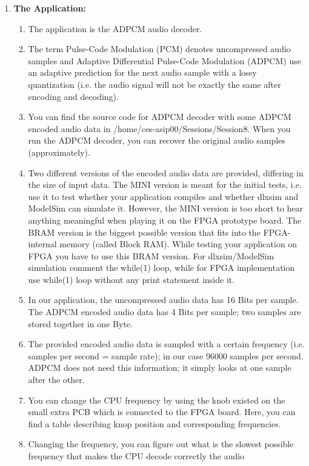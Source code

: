 \begin{enumerate}
\item \textbf{The Application:}
	\begin{enumerate}
		\item
		The application is the ADPCM audio decoder.
		\item
		The term Pulse-Code Modulation (PCM) denotes uncompressed audio
		samples and Adaptive Differential Pulse-Code Modulation (ADPCM) use
		an adaptive prediction for the next audio sample with a lossy
		quantization (i.e. the audio signal will not be exactly the same
		after encoding and decoding).
		\item
		You can find the source code for ADPCM decoder with some ADPCM
		encoded audio data in /home/ces-asip00/Sessions/Session8. When you run
		the ADPCM decoder, you can recover the original audio samples
		(approximately).
		\item
		Two different versions of the encoded audio data are provided,
		differing in the size of input data. The MINI version is meant for
		the initial tests, i.e. use it to test whether your application
		compiles and whether dlxsim and ModelSim can simulate it. However,
		the MINI version is too short to hear anything meaningful when
		playing it on the FPGA prototype board. The BRAM version is the
		biggest possible version that fits into the FPGA-internal memory
		(called Block RAM). While testing your application on FPGA you have
		to use this BRAM version. For dlxsim/ModelSim simulation comment the
		while(1) loop, while for FPGA implementation use while(1) loop
		without any print statement inside it.
		\item
		In our application, the uncompressed audio data has 16 Bits per
		sample. The ADPCM encoded audio data has 4 Bits per sample; two
		samples are stored together in one Byte.
		\item
		The provided encoded audio data is sampled with a certain frequency
		(i.e. samples per second = sample rate); in our case 96000 samples
		per second. ADPCM does not need this information; it simply looks at
		one sample after the other.
		\item
		You can change the CPU frequency by using the knob existed on the
		small extra PCB which is connected to the FPGA board. Here, you can
		find a table describing knop position and corresponding frequencies.
		\item
		Changing the frequency, you can figure out what is the slowest
		possible frequency that makes the CPU decode correctly the audio

\end{enumerate}
\end{enumerate}
